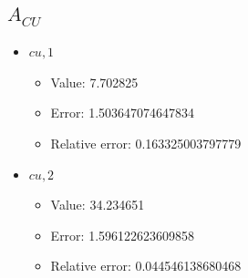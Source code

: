 \documentclass{article}%
\begin{document}
\subsection{$A_{CU}$}%
\begin{itemize}%
	\item $\textit{cu},1$%
	\begin{itemize}%
		\item Value: 7.702825%
		\item Error: 1.503647074647834%
		\item Relative error: 0.163325003797779%
	\end{itemize}%
	\item $\textit{cu},2$%
	\begin{itemize}%
		\item Value: 34.234651%
		\item Error: 1.596122623609858%
		\item Relative error: 0.044546138680468%
	\end{itemize}%
\end{itemize}%
\end{document}
